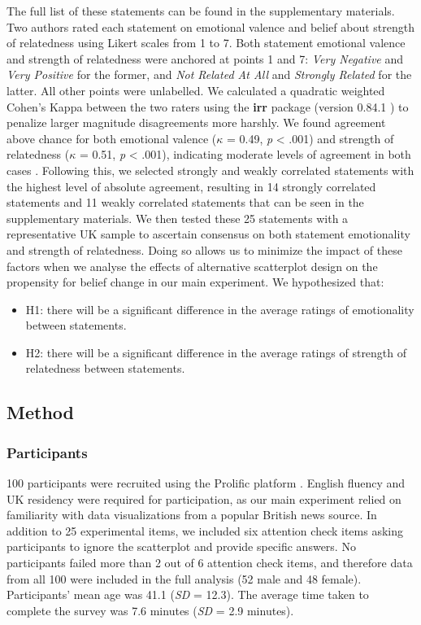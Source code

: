 \documentclass[manuscript,screen,review,anonymous]{acmart}
\providecommand{\tightlist}{%
  \setlength{\itemsep}{0pt}\setlength{\parskip}{0pt}}\usepackage{longtable,booktabs,array}
\begin{document}
The full list of these statements can be found in the supplementary
materials. Two authors rated each statement on emotional valence and
belief about strength of relatedness using Likert scales from 1 to 7.
Both statement emotional valence and strength of relatedness were
anchored at points 1 and 7: \emph{Very Negative} and \emph{Very
Positive} for the former, and \emph{Not Related At All} and
\emph{Strongly Related} for the latter. All other points were
unlabelled. We calculated a quadratic weighted Cohen's Kappa between the
two raters using the \textbf{irr} package (version 0.84.1 \citep{irr})
to penalize larger magnitude disagreements more harshly. We found
agreement above chance for both emotional valence (\(\kappa\) = 0.49,
\emph{p} \textless{} .001) and strength of relatedness (\(\kappa\) =
0.51, \emph{p} \textless{} .001), indicating moderate levels of
agreement in both cases \citep{cohen_1968, fleiss_1969}. Following this,
we selected strongly and weakly correlated statements with the highest
level of absolute agreement, resulting in 14 strongly correlated
statements and 11 weakly correlated statements that can be seen in the
supplementary materials. We then tested these 25 statements with a
representative UK sample to ascertain consensus on both statement
emotionality and strength of relatedness. Doing so allows us to minimize
the impact of these factors when we analyse the effects of alternative
scatterplot design on the propensity for belief change in our main
experiment. We hypothesized that:

\begin{itemize}
\tightlist
\item
  H1: there will be a significant difference in the average ratings of
  emotionality between statements.
\item
  H2: there will be a significant difference in the average ratings of
  strength of relatedness between statements.
\end{itemize}

\subsection{Method}\label{sec-method-pre}

\subsubsection{Participants}\label{sec-participants-pre}

100 participants were recruited using the Prolific platform
\citep{prolific}. English fluency and UK residency were required for
participation, as our main experiment relied on familiarity with data
visualizations from a popular British news source. In addition to 25
experimental items, we included six attention check items asking
participants to ignore the scatterplot and provide specific answers. No
participants failed more than 2 out of 6 attention check items, and
therefore data from all 100 were included in the full analysis (52 male
and 48 female). Participants' mean age was 41.1 (\emph{SD} = 12.3). The
average time taken to complete the survey was 7.6 minutes (\emph{SD} =
2.9 minutes).
\end{document}
